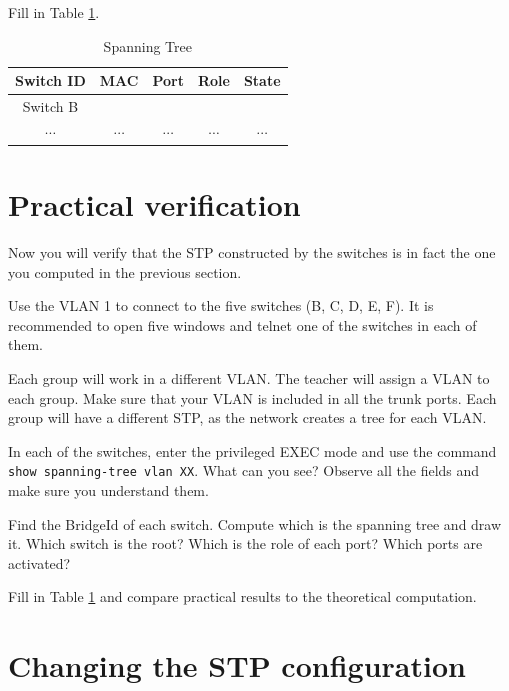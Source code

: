 Fill in Table \ref{tab:stp}.

\begin{table}[!t]
\renewcommand{\arraystretch}{1.3}
\caption{Spanning Tree}
\label{tab:stp}
\centering
\begin{tabular}{|c|c|c|c|c|}
\hline
 Switch ID & MAC & Port & Role & State\\
\hline
 \multirow{3}{*}{Switch B}& & & & \\
\cline{2-5}
 & & & & \\
\cline{2-5}
 & & & & \\
\hline
 $\cdots$ &  $\cdots$ &  $\cdots$ &  $\cdots$ & $\cdots$ \\
\hline
\end{tabular}
\end{table}

\section{Practical verification}

Now you will verify that the STP constructed by the switches is in fact the one you computed in the previous section.

Use the VLAN 1 to connect to the five switches (B, C, D, E, F).
It is recommended to open five windows and telnet one of the switches in each of them.

Each group will work in a different VLAN.
The teacher will assign a VLAN to each group.
Make sure that your VLAN is included in all the trunk ports.
Each group will have a different STP, as the network creates a tree for each VLAN.

In each of the switches, enter the privileged EXEC mode and use the command \texttt{show spanning-tree vlan XX}.
What can you see?
Observe all the fields and make sure you understand them.

Find the BridgeId of each switch.
Compute which is the spanning tree and draw it.
Which switch is the root?
Which is the role of each port?
Which ports are activated?

Fill in Table \ref{tab:stp} and compare practical results to the theoretical computation.

\section{Changing the STP configuration}


